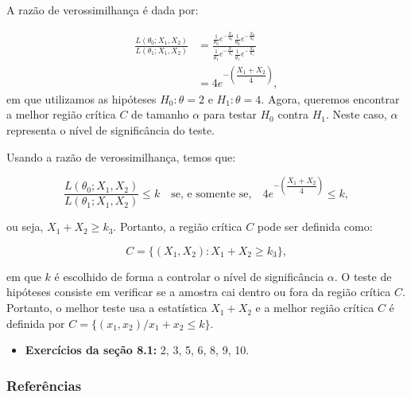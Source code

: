 \documentclass[12pt]{beamer}
\begin{document}
\begin{frame}{}
\begin{block}{}
\justifying
A razão de verossimilhança é dada por:

\begin{align*}
    \frac{L(\theta_0; X_1, X_2)}{L(\theta_1; X_1, X_2)} &= \frac{\frac{1}{\theta_0} e^{-\frac{X_1}{\theta_0}} \frac{1}{\theta_0} e^{-\frac{X_2}{\theta_0}}}{\frac{1}{\theta_1} e^{-\frac{X_1}{\theta_1}} \frac{1}{\theta_1} e^{-\frac{X_2}{\theta_1}}}\\ 
&= 4e^{-\left(\dfrac{X_1+X_2}{4}\right)},
\end{align*}
em que utilizamos as hipóteses $H_0: \theta = 2$ e $H_1: \theta = 4.$ Agora, queremos encontrar a melhor região crítica $C$ de tamanho $\alpha$ para testar $H_0$ contra $H_1$. Neste caso, $\alpha$ representa o nível de significância do teste.
\end{block}
\end{frame}


\begin{frame}{}
\begin{block}{}
\justifying
Usando a razão de verossimilhança, temos que:

\[
\frac{L(\theta_0; X_1, X_2)}{L(\theta_1; X_1, X_2)} \leq k \quad \text{se, e somente se,} \quad 4e^{-\left(\dfrac{X_1+X_2}{4}\right)} \leq k,
\]

ou seja, $X_1 + X_2 \geq k_{3}$. Portanto, a região crítica $C$ pode ser definida como:

\[
C = \{(X_1, X_2) : X_1 + X_2 \geq k_{3}\},
\]

em que $k$ é escolhido de forma a controlar o nível de significância $\alpha$. O teste de hipóteses consiste em verificar se a amostra cai dentro ou fora da região crítica $C$. Portanto, o melhor teste usa a estatística $X_1 + X_2$ e a melhor região crítica $C$ é definida por $C=\{(x_{1},x_{2})/x_{1}+x_{2}\leq k\}$.
\end{block}
\end{frame}

\begin{frame}{\Home}
\begin{block}{}
\justifying

\begin{itemize}
    \item \textbf{Exercícios da seção 8.1:} 2, 3, 5, 6, 8, 9, 10.
\end{itemize}
\end{block}
\nocite{hogg}
\end{frame}

\begin{frame}[allowframebreaks]
\frametitle{\bf Referências}
\printbibliography
\end{frame}
\end{document}
